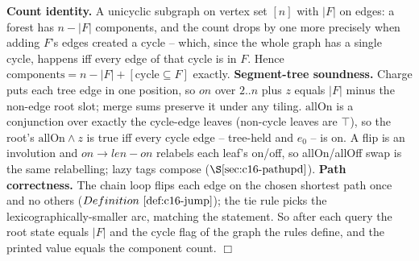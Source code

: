 \begin{proofbox}
\textbf{Count identity.} A unicyclic subgraph on vertex set \([n]\) with \(|F|\) on edges: a forest
has \(n-|F|\) components, and the count drops by one more precisely when adding \(F\)'s edges
created a cycle -- which, since the whole graph has a single cycle, happens iff every edge of that
cycle is in \(F\). Hence \(\text{components}=n-|F|+[\text{cycle}\subseteq F]\) exactly.
\textbf{Segment-tree soundness.} Charge puts each tree edge in one position, so \(\mathit{on}\) over
\(2..n\) plus \(z\) equals \(|F|\) minus the non-edge root slot; merge sums preserve it under any
tiling. \(\text{allOn}\) is a conjunction over exactly the cycle-edge leaves (non-cycle leaves are
\(\top\)), so the root's \(\text{allOn}\wedge z\) is true iff every cycle edge -- tree-held and
\(e_0\) -- is on. A flip is an involution and \(\mathit{on}\to\mathit{len}-\mathit{on}\) relabels
each leaf's on/off, so allOn/allOff swap is the same relabelling; lazy tags compose (\(\secref{c16-pathupd}\)).
\textbf{Path correctness.} The chain loop flips each edge on the chosen shortest path once and no
others (\(\defref{c16-jump}\)); the tie rule picks the lexicographically-smaller arc, matching the
statement. So after each query the root state equals \(|F|\) and the cycle flag of the graph the
rules define, and the printed value equals the component count. \(\Box\)
\end{proofbox}

